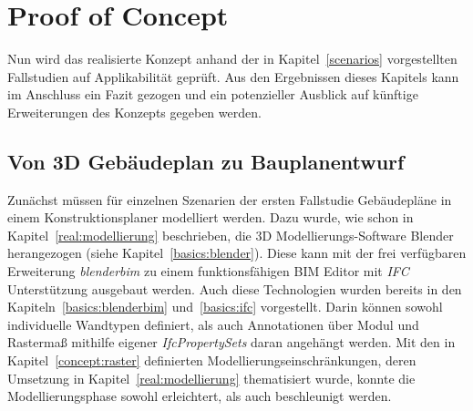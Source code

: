 \chapter{Proof of Concept}
Nun wird das realisierte Konzept anhand der in Kapitel~\ref{scenarios} vorgestellten Fallstudien auf Applikabilität geprüft.
Aus den Ergebnissen dieses Kapitels kann im Anschluss ein Fazit gezogen und ein potenzieller Ausblick auf künftige Erweiterungen des Konzepts gegeben werden.

\section{Von 3D Gebäudeplan zu Bauplanentwurf}
Zunächst müssen für einzelnen Szenarien der ersten Fallstudie Gebäudepläne in einem Konstruktionsplaner modelliert werden.
Dazu wurde, wie schon in Kapitel~\ref{real:modellierung} beschrieben, die 3D Modellierungs-Software Blender herangezogen (siehe Kapitel~\ref{basics:blender}).
Diese kann mit der frei verfügbaren Erweiterung \textit{blenderbim} zu einem funktionsfähigen BIM Editor mit \textit{IFC} Unterstützung ausgebaut werden.
Auch diese Technologien wurden bereits in den Kapiteln~\ref{basics:blenderbim} und~\ref{basics:ifc} vorgestellt.
Darin können sowohl individuelle Wandtypen definiert, als auch Annotationen über Modul und Rastermaß mithilfe eigener \textit{IfcPropertySets} daran angehängt werden.
Mit den in Kapitel~\ref{concept:raster} definierten Modellierungseinschränkungen, deren Umsetzung in Kapitel~\ref{real:modellierung} thematisiert wurde, konnte die Modellierungsphase sowohl erleichtert, als auch beschleunigt werden.

